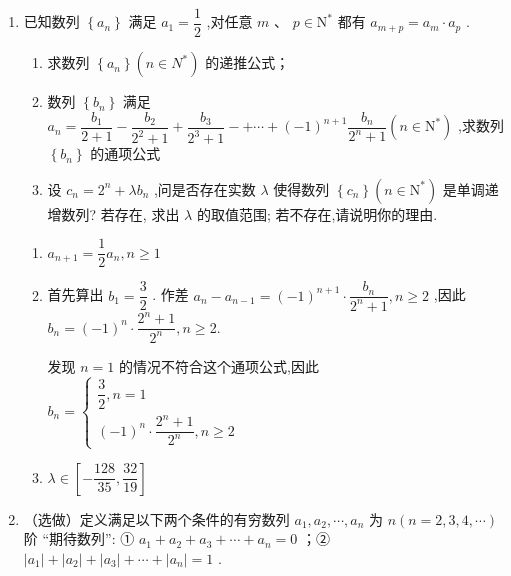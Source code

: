 \begin{enumerate}
\begin{jieda}
\begin{enumerate}
        \end{enumerate}
    \end{jieda}

     \item 已知数列 $\left\{  {a}_{n}\right\}$ 满足 ${a}_{1} = \dfrac{1}{2}$ ,对任意 $m\text{ 、 }p \in  {\mathrm{N}}^{ * }$ 都有 ${a}_{m + p} = {a}_{m} \cdot  {a}_{p}$ .

    \begin{enumerate}
        \item 求数列 $\left\{  {a}_{n}\right\}  \left( {n \in  {N}^{ * }}\right)$ 的递推公式；
        \item 数列 $\left\{  {b}_{n}\right\}$ 满足 ${a}_{n} = \dfrac{{b}_{1}}{2 + 1} - \dfrac{{b}_{2}}{{2}^{2} + 1} + \dfrac{{b}_{3}}{{2}^{3} + 1} -  + \cdots  + {\left( -1\right) }^{n + 1}\dfrac{{b}_{n}}{{2}^{n} + 1}\left( {n \in  {\mathrm{N}}^{ * }}\right)$ ,求数列 $\left\{  {b}_{n}\right\}$ 的通项公式
        \item 设 ${c}_{n} = {2}^{n} + \lambda {b}_{n}$ ,问是否存在实数 $\lambda$ 使得数列 $\left\{  {c}_{n}\right\}  \left( {n \in  {\mathrm{N}}^{ * }}\right)$ 是单调递增数列? 若存在, 求出 $\lambda$ 的取值范围; 若不存在,请说明你的理由.
    \end{enumerate}
    \begin{jieda}
    \begin{enumerate}
        \item ${a}_{n + 1} = \dfrac{1}{2}{a}_{n},n \geq  1$
        \item 首先算出 ${b}_{1} = \dfrac{3}{2}$ . 作差 ${a}_{n} - {a}_{n - 1} = {\left( -1\right) }^{n + 1} \cdot  \dfrac{{b}_{n}}{{2}^{n} + 1},n \geq  2$ ,因此 ${b}_{n} = {\left( -1\right) }^{n} \cdot  \dfrac{{2}^{n} + 1}{{2}^{n}},n \geq$2. 
        
        发现 $n = 1$ 的情况不符合这个通项公式,因此 ${b}_{n} = \left\{  \begin{matrix} \dfrac{3}{2},n = 1 \\  {\left( -1\right) }^{n} \cdot  \dfrac{{2}^{n} + 1}{{2}^{n}},n \geq  2 \end{matrix}\right.$

        \item $\lambda  \in  \left\lbrack  {-\dfrac{128}{35},\dfrac{32}{19}}\right\rbrack$
    \end{enumerate}
    \end{jieda}
    
    
    \item （选做）定义满足以下两个条件的有穷数列 ${a}_{1},{a}_{2},\cdots ,{a}_{n}$ 为 $n\left( {n = 2,3,4,\cdots }\right)$ 阶 “期待数列”: ① ${a}_{1} + {a}_{2} + {a}_{3} + \cdots  + {a}_{n} = 0$ ；② $\left| {a}_{1}\right|  + \left| {a}_{2}\right|  + \left| {a}_{3}\right|  + \cdots  + \left| {a}_{n}\right|  = 1$ .
    

\end{enumerate}

